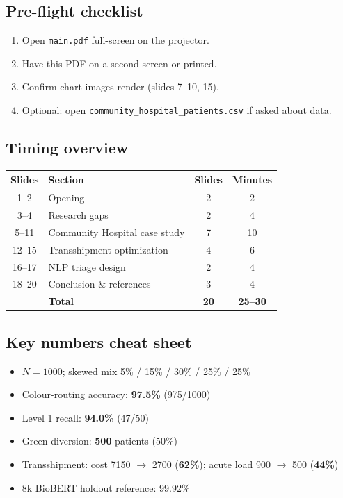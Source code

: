 \documentclass[11pt]{article}
\begin{document}
\subsection*{Pre-flight checklist}
\begin{enumerate}
  \item Open \texttt{main.pdf} full-screen on the projector.
  \item Have this PDF on a second screen or printed.
  \item Confirm chart images render (slides 7--10, 15).
  \item Optional: open \texttt{community\_hospital\_patients.csv} if asked about data.
\end{enumerate}

\subsection*{Timing overview}
\begin{center}
\small
\begin{tabular}{@{}clcc@{}}
\toprule
Slides & Section & Slides & Minutes \\
\midrule
1--2 & Opening & 2 & 2 \\
3--4 & Research gaps & 2 & 4 \\
5--11 & Community Hospital case study & 7 & 10 \\
12--15 & Transshipment optimization & 4 & 6 \\
16--17 & NLP triage design & 2 & 4 \\
18--20 & Conclusion \& references & 3 & 4 \\
\midrule
& \textbf{Total} & \textbf{20} & \textbf{25--30} \\
\bottomrule
\end{tabular}
\end{center}

\subsection*{Key numbers cheat sheet}
\begin{itemize}[noitemsep]
  \item $N = 1000$; skewed mix 5\% / 15\% / 30\% / 25\% / 25\%
  \item Colour-routing accuracy: \textbf{97.5\%} (975/1000)
  \item Level 1 recall: \textbf{94.0\%} (47/50)
  \item Green diversion: \textbf{500} patients (50\%)
  \item Transshipment: cost 7150 $\to$ 2700 (\textbf{62\%}); acute load 900 $\to$ 500 (\textbf{44\%})
  \item 8k BioBERT holdout reference: 99.92\%
\end{itemize}
\end{document}
